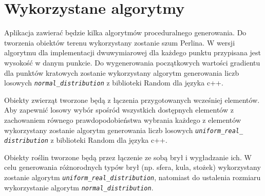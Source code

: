 \chapter{Wykorzystane algorytmy}

Aplikacja zawierać będzie kilka algorytmów proceduralnego generowania. Do tworzenia obiektów terenu wykorzystany zostanie szum Perlina. W wersji algorytmu dla implementacji dwuwymiarowej dla każdego punktu przypisana jest wysokość w danym punkcie. Do wygenerowania początkowych wartości gradientu dla punktów kratowych zostanie wykorzystany algorytm generowania liczb losowych \texttt{\textit{normal\-\_distribution}} z biblioteki Random dla języka c++.

Obiekty zwierząt tworzone będą z łączenia przygotowanych wcześniej elementów. Aby zapewnić losowy wybór spośród wszystkich dostępnych elementów z zachowaniem równego prawdopodobieństwa wybrania każdego z elementów wykorzystany zostanie algorytm generowania liczb losowych \texttt{\textit{uniform\_real\_ distribution}} z biblioteki Random dla języka c++.

Obiekty roślin tworzone będą przez łączenie ze sobą brył i wygładzanie ich. W celu generowania różnorodnych typów brył (np. sfera, kula, stożek) wykorzystany zostanie algorytm \texttt{\textit{uniform\_real\_distribution}}, natomiast do ustalenia rozmiaru wykorzystanie algorytm \texttt{\textit{normal\-\_distribution}}.